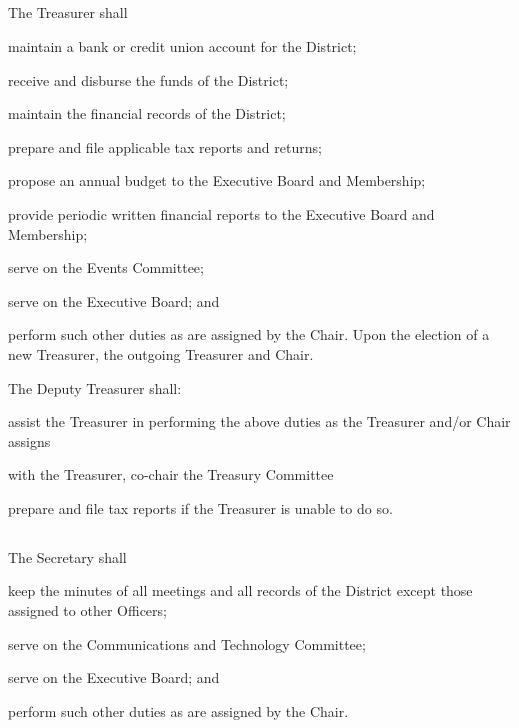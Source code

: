 \documentclass{article}
\newcommand{\fortythird}{\nth{43}}
\newcommand{\district}{\fortythird{} District}
\newcommand{\thedistrict}{the \district{}}
\begin{document}
\subsection{}
The Treasurer shall
\begin{inlinealphalist}
    \item maintain a bank or credit union account for \thedistrict{};
    \item receive and disburse the funds of \thedistrict{};
    \item maintain the financial records of \thedistrict{};
    \item prepare and file applicable tax reports and returns;
    \item propose an annual budget to the Executive Board and Membership;
    \item provide periodic written financial reports to the Executive Board and Membership;
    \item serve on the Events Committee;
    \item serve on the Executive Board; and
    \item perform such other duties as are assigned by the Chair. Upon the election of a new Treasurer, the outgoing Treasurer and Chair.
\end{inlinealphalist}

The Deputy Treasurer shall:
\begin{inlinealphalist}
    \item assist the Treasurer in performing the above duties as the Treasurer and/or Chair assigns
    \item with the Treasurer, co-chair the Treasury Committee
    \item prepare and file tax reports if the Treasurer is unable to do so.
\end{inlinealphalist}

\subsection{}
The Secretary shall
\begin{inlinealphalist}
    \item keep the minutes of all meetings and all records of \thedistrict{} except those assigned to other Officers;
    \item serve on the Communications and Technology Committee;
    \item serve on the Executive Board; and
    \item perform such other duties as are assigned by the Chair.
\end{inlinealphalist}
\end{document}
